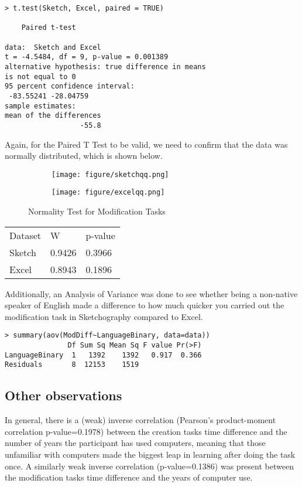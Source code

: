\begin{verbatim}
> t.test(Sketch, Excel, paired = TRUE)

	Paired t-test

data:  Sketch and Excel
t = -4.5484, df = 9, p-value = 0.001389
alternative hypothesis: true difference in means 
is not equal to 0
95 percent confidence interval:
 -83.55241 -28.04759
sample estimates:
mean of the differences 
                  -55.8 
\end{verbatim}

Again, for the Paired T Test to be valid, we need to confirm that the data was normally distributed, which is shown below.
\begin{figure}[H]
		\centering
		\begin{subfigure}[b]{\textwidth}
			\texttt{[image: figure/sketchqq.png]}
		\end{subfigure}
		\begin{subfigure}[b]{\textwidth}
			\texttt{[image: figure/excelqq.png]}
		\end{subfigure}
		\caption{Normality Test for Modification Tasks}
	\end{figure}


\begin{tabular}{l l l}
Dataset & W & p-value \\
Sketch & 0.9426 & 0.3966 \\
Excel & 0.8943 & 0.1896 \\
\end{tabular}

Additionally, an Analysis of Variance was done to see whether being a non-native speaker of English made a difference to how much quicker you carried out the modification task in Sketchography compared to Excel.
\begin{verbatim}
> summary(aov(ModDiff~LanguageBinary, data=data))
               Df Sum Sq Mean Sq F value Pr(>F)
LanguageBinary  1   1392    1392   0.917  0.366
Residuals       8  12153    1519    
\end{verbatim}

\subsection{Other observations}
In general, there is a (weak) inverse correlation (Pearson's product-moment correlation p-value=0.1978) between the creation tasks time difference and the number of years the participant has used computers, meaning that those unfamiliar with computers made the biggest leap in learning after doing the task once. A similarly weak inverse correlation (p-value=0.1386) was present between the modification tasks time difference and the years of computer use.

